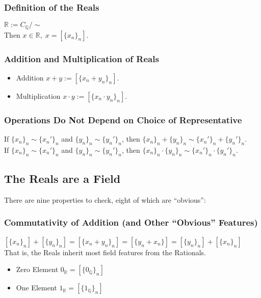 \documentclass[11pt]{article}
\newcommand{\0}{\emptyset}
\newcommand{\Q}{\mathbb{Q}}
\newcommand{\R}{\mathbb{R}}
\begin{document}
\subsubsection*{Definition of the Reals}
\label{sec:org14f2f8b}
\(\R:=C_{\Q}/\sim\)\\[0pt]
Then \(x\in\R,\;x=[\{x_{n}\}_{n}]\).\\[0pt]
\subsubsection*{Addition and Multiplication of Reals}
\label{sec:org77ba01e}
\begin{itemize}
\item Addition
\label{sec:orge8ae36f}
\(x+y:=[\{x_{n}+y_{n}\}_{n}]\).\\[0pt]
\item Multiplication
\label{sec:org286a4c9}
\(x\cdot y:=[\{x_{n}\cdot y_{n}\}_{n}]\).\\[0pt]
\end{itemize}
\subsubsection*{Operations Do Not Depend on Choice of Representative}
\label{sec:orga0fdaee}
If \(\{x_{n}\}_{n}\sim\{x_{n}'\}_{n}\) and \(\{y_{n}\}_{n}\sim\{y_{n}'\}_{n}\), then \(\{x_{n}\}_{n}+\{y_{n}\}_{n}\sim\{x_{n}'\}_{n}+\{y_{n}'\}_{n}\).\\[0pt]
If \(\{x_{n}\}_{n}\sim\{x_{n}'\}_{n}\) and \(\{y_{n}\}_{n}\sim\{y_{n}'\}_{n}\), then \(\{x_{n}\}_{n}\cdot \{y_{n}\}_{n}\sim\{x_{n}'\}_{n}\cdot\{y_{n}'\}_{n}\).\\[0pt]
\subsection*{The Reals are a Field}
\label{sec:org2b12b10}
There are nine properties to check, eight of which are ``obvious'':\\[0pt]
\subsubsection*{Commutativity of Addition (and Other ``Obvious'' Features)}
\label{sec:org3afed70}
\([\{x_{n}\}_{n}]+[\{y_{n}\}_{n}]=[\{x_{n}+y_{n}\}_{n}]=[\{y_{n}+x_{n}\}]=[\{y_{n}\}_{n}]+[\{x_{n}\}_{n}]\)\\[0pt]
That is, the Reals inherit most field features from the Rationals.\\[0pt]
\begin{itemize}
\item Zero Element
\label{sec:org2592e49}
\(0_{\R}=[\{0_{\Q}\}_{n}]\)\\[0pt]
\item One Element
\label{sec:org5624dc3}
\(1_{\R}=[\{1_{\Q}\}_{n}]\)\\[0pt]
\end{itemize}
\end{document}
